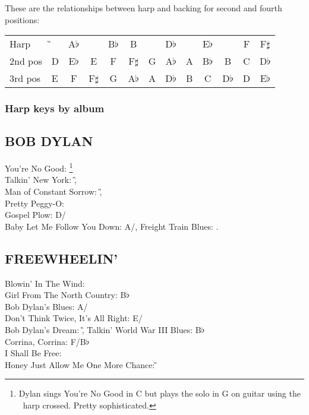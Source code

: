 These are the relationships between harp and backing for second and
fourth positions:

\begin{center}\begin{tabular}{llccccccccccc}
Harp & \G & A$\flat$ & \A & B$\flat$ & B & \C & D$\flat$ & \D & E$\flat$ & \E & F& F$\sharp$\tabularnewline
2nd pos & D & E$\flat$ & E & F & F$\sharp$ & G & A$\flat$ & A & B$\flat$ & B & C & D$\flat$\tabularnewline
3rd pos & E & F & F$\sharp$ & G & A$\flat$ & A & D$\flat$ & B & C & D$\flat$ & D & E$\flat$\tabularnewline
\end{tabular}\end{center}

\subsubsection*{Harp keys by album}

\subsection{BOB DYLAN}
You're No Good: \C\footnote{Dylan sings You're No Good in C but plays the solo in G on guitar using the \C~harp crossed. Pretty sophisticated.} \\
Talkin' New York: \G,\\
Man of Constant Sorrow: \G,\\
Pretty Peggy-O: \G\\ Gospel Plow: D/\G\\ Baby Let Me Follow You Down: A/\D,
Freight Train Blues: \C.


\subsection{FREEWHEELIN'}
Blowin' In The Wind: \D\\
Girl From The North Country: B$\flat$\\
Bob Dylan's Blues: A/\D\\
Don't Think Twice, It's All Right: E/\A\\
Bob Dylan's Dream: \G,
 Talkin' World War III Blues: B$\flat$\\
 Corrina, Corrina: F/B$\flat$\\
 I Shall Be Free: \G\\
 Honey Just Allow Me One More Chance: \G


